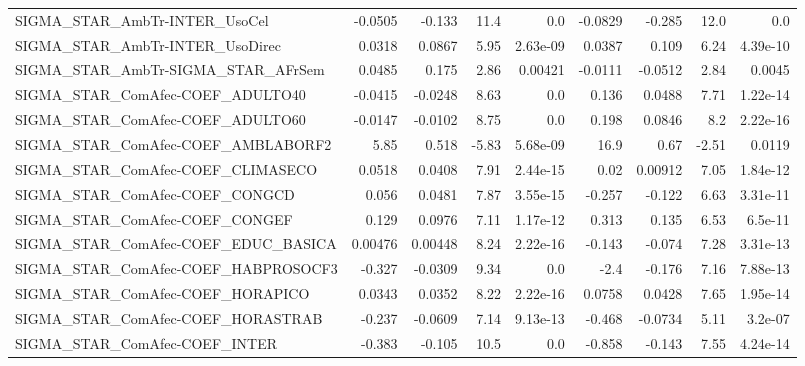 \begin{tabular}{lrrrrrrrr}
SIGMA\_STAR\_AmbTr-INTER\_UsoCel          &     -0.0505 &       -0.133 &     11.4 &      0.0 &    -0.0829 &      -0.285 &         12.0 &           0.0 \\
SIGMA\_STAR\_AmbTr-INTER\_UsoDirec        &      0.0318 &       0.0867 &     5.95 & 2.63e-09 &     0.0387 &       0.109 &         6.24 &      4.39e-10 \\
SIGMA\_STAR\_AmbTr-SIGMA\_STAR\_AFrSem     &      0.0485 &        0.175 &     2.86 &  0.00421 &    -0.0111 &     -0.0512 &         2.84 &        0.0045 \\
SIGMA\_STAR\_ComAfec-COEF\_ADULTO40       &     -0.0415 &      -0.0248 &     8.63 &      0.0 &      0.136 &      0.0488 &         7.71 &      1.22e-14 \\
SIGMA\_STAR\_ComAfec-COEF\_ADULTO60       &     -0.0147 &      -0.0102 &     8.75 &      0.0 &      0.198 &      0.0846 &          8.2 &      2.22e-16 \\
SIGMA\_STAR\_ComAfec-COEF\_AMBLABORF2     &        5.85 &        0.518 &    -5.83 & 5.68e-09 &       16.9 &        0.67 &        -2.51 &        0.0119 \\
SIGMA\_STAR\_ComAfec-COEF\_CLIMASECO      &      0.0518 &       0.0408 &     7.91 & 2.44e-15 &       0.02 &     0.00912 &         7.05 &      1.84e-12 \\
SIGMA\_STAR\_ComAfec-COEF\_CONGCD         &       0.056 &       0.0481 &     7.87 & 3.55e-15 &     -0.257 &      -0.122 &         6.63 &      3.31e-11 \\
SIGMA\_STAR\_ComAfec-COEF\_CONGEF         &       0.129 &       0.0976 &     7.11 & 1.17e-12 &      0.313 &       0.135 &         6.53 &       6.5e-11 \\
SIGMA\_STAR\_ComAfec-COEF\_EDUC\_BASICA    &     0.00476 &      0.00448 &     8.24 & 2.22e-16 &     -0.143 &      -0.074 &         7.28 &      3.31e-13 \\
SIGMA\_STAR\_ComAfec-COEF\_HABPROSOCF3    &      -0.327 &      -0.0309 &     9.34 &      0.0 &       -2.4 &      -0.176 &         7.16 &      7.88e-13 \\
SIGMA\_STAR\_ComAfec-COEF\_HORAPICO       &      0.0343 &       0.0352 &     8.22 & 2.22e-16 &     0.0758 &      0.0428 &         7.65 &      1.95e-14 \\
SIGMA\_STAR\_ComAfec-COEF\_HORASTRAB      &      -0.237 &      -0.0609 &     7.14 & 9.13e-13 &     -0.468 &     -0.0734 &         5.11 &       3.2e-07 \\
SIGMA\_STAR\_ComAfec-COEF\_INTER          &      -0.383 &       -0.105 &     10.5 &      0.0 &     -0.858 &      -0.143 &         7.55 &      4.24e-14 \\

\end{tabular}
